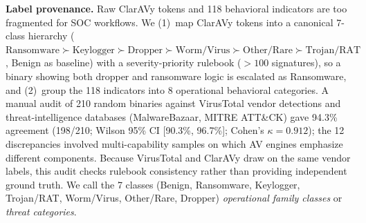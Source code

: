 \documentclass[Number]{sn-jnl}
\begin{document}
\noindent\textbf{Label provenance.}
Raw ClarAVy tokens and 118 behavioral indicators are too fragmented for SOC workflows. We (1)~map ClarAVy tokens into a canonical 7-class hierarchy ($\text{Ransomware} \succ \text{Keylogger} \succ \text{Dropper} \succ \text{Worm/Virus} \succ \text{Other/Rare} \succ \text{Trojan/RAT}$, Benign as baseline) with a severity-priority rulebook ($>100$ signatures), so a binary showing both dropper and ransomware logic is escalated as Ransomware, and (2)~group the 118 indicators into 8 operational behavioral categories. A manual audit of 210 random binaries against VirusTotal vendor detections and threat-intelligence databases (MalwareBazaar, MITRE ATT\&CK) gave 94.3\% agreement (198/210; Wilson 95\% CI [90.3\%, 96.7\%]; Cohen's $\kappa = 0.912$); the 12 discrepancies involved multi-capability samples on which AV engines emphasize different components. Because VirusTotal and ClarAVy draw on the same vendor labels, this audit checks rulebook consistency rather than providing independent ground truth. We call the 7 classes (Benign, Ransomware, Keylogger, Trojan/RAT, Worm/Virus, Other/Rare, Dropper) \emph{operational family classes} or \emph{threat categories}.
\end{document}
